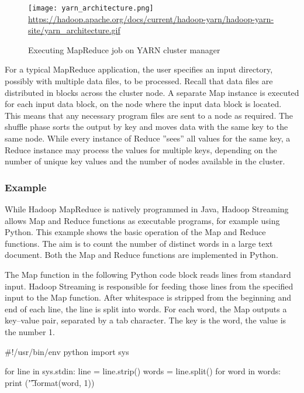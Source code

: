 \begin{figure}
\centering
\texttt{[image: yarn\_architecture.png]}\\

\scriptsize\url{https://hadoop.apache.org/docs/current/hadoop-yarn/hadoop-yarn-site/yarn_architecture.gif}\normalsize
\caption{Executing MapReduce job on YARN cluster manager}
\label{fig:yarnhadoop}
\end{figure}

For a typical MapReduce application, the user specifies an input directory, possibly with multiple data files, to be processed. Recall that data files are distributed in blocks across the cluster node. A separate Map instance is executed for each input data block, on the node where the input data block is located. This means that any necessary program files are sent to a node as required. The shuffle phase sorts the output by key and moves data with the same key to the same node. While every instance of Reduce ''sees'' all values for the same key, a Reduce instance may process the values for multiple keys, depending on the number of unique key values and the number of nodes available in the cluster. 

\subsubsection*{Example}

While Hadoop MapReduce is natively programmed in Java, Hadoop Streaming allows Map and Reduce functions as executable programs, for example using Python. This example shows the basic operation of the Map and Reduce functions. The aim is to count the number of distinct words in a large text document. Both the Map and Reduce functions are implemented in Python. 

The Map function in the following Python code block reads lines from standard input. Hadoop Streaming is responsible for feeding those lines from the specified input to the Map function. After whitespace is stripped from the beginning and end of each line, the line is split into words. For each word, the Map outputs a key--value pair, separated by a tab character. The key is the word, the value is the number 1.

\begin{pythoncode}
#!/usr/bin/env python
import sys

for line in sys.stdin:
    line = line.strip()
    words = line.split()
    for word in words:
        print ('{}\t{}'.format(word, 1))
\end{pythoncode}

